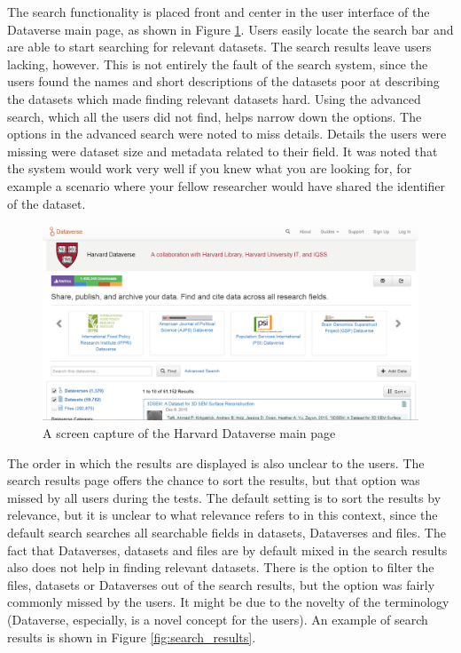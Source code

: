 The search functionality is placed front and center in the user interface of
the Dataverse main page, as shown in Figure \ref{fig:search_main_page}. Users
easily locate the search bar and are able to start searching for relevant
datasets. The search results leave users lacking, however. This is not entirely
the fault of the search system, since the users found the names and short
descriptions of the datasets poor at describing the datasets which made
finding relevant datasets hard. Using the advanced search, which all the users
did not find, helps narrow down the options. The options in the
advanced search were noted to miss details. Details the users were missing
were dataset size and metadata related to their field. It was noted that
the system would work very well if you knew what you are looking for, for example
a scenario where your fellow researcher would have shared the identifier of
the dataset.

\begin{figure}
    \begin{centering}
        \includegraphics[width=\textwidth]{images/search_main_page}
    \end{centering}
    \caption{A screen capture of the Harvard Dataverse main page}
    \label{fig:search_main_page}
\end{figure}

The order in which the results are displayed is also unclear to the users.
The search results page offers the chance to sort the results, but that option
was missed by all users during the tests. The default setting is to sort the results by
relevance, but it is unclear to what relevance refers to in this context, since
the default search searches all searchable fields in datasets, Dataverses and files.
The fact that Dataverses, datasets and files are by default mixed in the search
results also does not help in finding relevant datasets. There is the option to
filter the files, datasets or Dataverses out of the search results, but the
option was fairly commonly missed by the users. It might be due to the novelty
of the terminology (Dataverse, especially, is a novel concept for the users).
An example of search results is shown in  Figure \ref{fig:search_results}.

